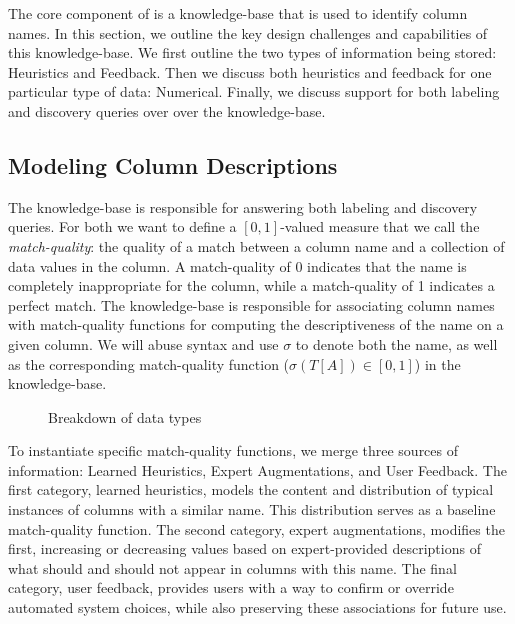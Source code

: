 
The core component of \systemname is a knowledge-base that is used to identify column names.
In this section, we outline the key design challenges and capabilities of this knowledge-base.  
We first outline the two types of information being stored: Heuristics and Feedback.
Then we discuss both heuristics and feedback for one particular type of data: Numerical.  
Finally, we discuss support for both labeling and discovery queries over over the knowledge-base.

\subsection{Modeling Column Descriptions}

The \systemname knowledge-base is responsible for answering both labeling and discovery queries.
For both we want to define a $[0,1]$-valued measure that we call the \emph{match-quality}: the quality of a match between a column name and a collection of data values in the column.
A match-quality of 0 indicates that the name is completely inappropriate for the column, while a match-quality of 1 indicates a perfect match.  
The \systemname knowledge-base is responsible for associating column names with match-quality functions for computing the descriptiveness of the name on a given column.
We will abuse syntax and use $\sigma$ to denote both the name, as well as the corresponding match-quality function ($\sigma(T[A]) \in [0,1]$) in the knowledge-base.

\begin{figure}
\caption{Breakdown of data types}
\label{fig:type-breakdown}
\end{figure}

To instantiate specific match-quality functions, we merge three sources of information: Learned Heuristics, Expert Augmentations, and User Feedback. 
The first category, learned heuristics, models the content and distribution of typical instances of columns with a similar name.
This distribution serves as a baseline match-quality function.
The second category, expert augmentations, modifies the first, increasing or decreasing values based on expert-provided descriptions of what should and should not appear in columns with this name.
The final category, user feedback, provides users with a way to confirm or override automated system choices, while also preserving these associations for future use.

